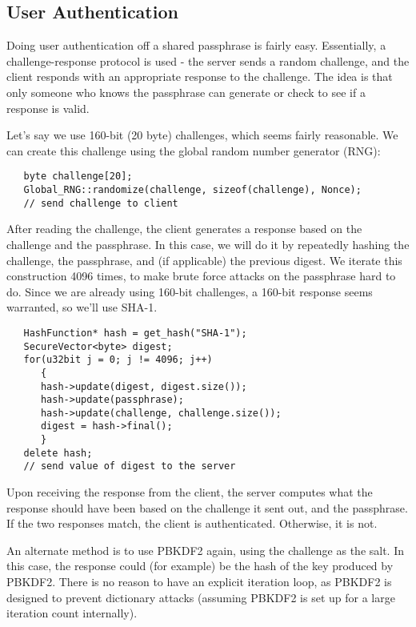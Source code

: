\documentclass{article}
\begin{document}
\subsection{User Authentication}

Doing user authentication off a shared passphrase is fairly easy. Essentially,
a challenge-response protocol is used - the server sends a random challenge,
and the client responds with an appropriate response to the challenge. The idea
is that only someone who knows the passphrase can generate or check to see if a
response is valid.

Let's say we use 160-bit (20 byte) challenges, which seems fairly
reasonable. We can create this challenge using the global random
number generator (RNG):

\begin{verbatim}
   byte challenge[20];
   Global_RNG::randomize(challenge, sizeof(challenge), Nonce);
   // send challenge to client
\end{verbatim}

After reading the challenge, the client generates a response based on
the challenge and the passphrase. In this case, we will do it by
repeatedly hashing the challenge, the passphrase, and (if applicable)
the previous digest. We iterate this construction 4096 times, to make
brute force attacks on the passphrase hard to do. Since we are already
using 160-bit challenges, a 160-bit response seems warranted, so we'll
use SHA-1.

\begin{verbatim}
   HashFunction* hash = get_hash("SHA-1");
   SecureVector<byte> digest;
   for(u32bit j = 0; j != 4096; j++)
      {
      hash->update(digest, digest.size());
      hash->update(passphrase);
      hash->update(challenge, challenge.size());
      digest = hash->final();
      }
   delete hash;
   // send value of digest to the server
\end{verbatim}

Upon receiving the response from the client, the server computes what the
response should have been based on the challenge it sent out, and the
passphrase. If the two responses match, the client is authenticated.
Otherwise, it is not.

An alternate method is to use PBKDF2 again, using the challenge as the salt. In
this case, the response could (for example) be the hash of the key produced by
PBKDF2. There is no reason to have an explicit iteration loop, as PBKDF2 is
designed to prevent dictionary attacks (assuming PBKDF2 is set up for a large
iteration count internally).
\end{document}
